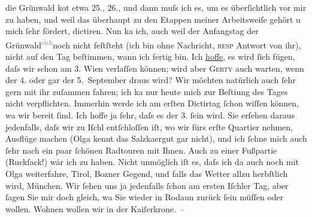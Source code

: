 \begin{ledgroupsized}[t]{13cm}
               die Grünwald ko{\geminationm}t
               etwa 25., 26., und dann muſs ich es, um es überſichtlich
               vor mir zu haben, und weil das überhaupt zu den Etappen meiner Arbeitsweiſe gehört u
               mich ſehr fördert, dictiren. Nun ka{\geminationn} ich, auch weil der
               Anfangstag der Grünwald\substVorne{}\textsuperscript{\textcolor{gray}{sich}}\substDazwischen{}noch nicht feſtſteht\substHinten{} (ich bin ohne Nachricht, \textsc{resp} Antwort von ihr),
               nicht {\pb}auf den Tag beſtimmen, wann ich fertig bin. Ich
                  \uline{hoffe}, es wird ſich fügen, daſs wir schon am
                  3.{ }Wien verlaſſen können; wird aber \textsc{Gerty} auch warten, wenn der 4. oder gar der 5. September
               draus wird? Wir möchten natürlich auch ſehr gern mit ihr zuſammen fahren; ich ka{\geminationn} nur heute mich zur Beſti{\geminationm}ung des Tages nicht verpflichten. Immerhin werde ich am erſten Dictirtag ſchon
               wiſſen können, wa{\geminationn} wir bereit ſind. Ich hoffe ja ſehr,
               daſs es der 3.{ }ſein wird. Sie erſehen daraus {\pb}jedenfalls, daſs wir zu Iſchl entſchloſſen iſt, wo wir fürs erſte Quartier nehmen, Ausflüge machen
                  (Olga kennt das Salzka{\geminationm}ergut gar nicht), und ich ſehne mich
               auch ſehr nach ein paar ſchönen Radtouren mit Ihnen. Auch zu einer Fußpartie
               (Ruckſack!) wär ich zu haben. Nicht unmöglich iſt es, daſs ich da{\geminationn} auch noch mit Olga
               weiterfahre, Tirol, Bozner Gegend, und falls das Wetter allzu herbſtlich wird, München. Wir ſehen uns ja jedenfalls ſchon am ersten {\pb}Iſchler Tag, aber ſagen Sie mir doch gleich, wa{\geminationn}{ }Sie wieder in Rodaun zurück ſein müſſen oder wollen. Wohnen wollen wir in der Kaiſerkrone. –\pend

\end{ledgroupsized}
